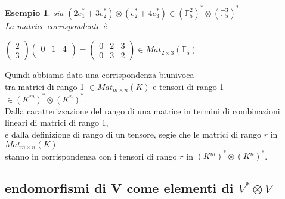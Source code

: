 \documentclass[a4paper,12pt]{article}
\theoremstyle{def}
\theoremstyle{prop}
\theoremstyle{esempio}
\newtheorem*{example}{Esempio}
\theoremstyle{dimostrazione}
\theoremstyle{teo}
\theoremstyle{osservazione}
\begin{document}
\begin{example}
	sia \((2 e_1^* + 3 e_2^*) \otimes (e_2^* + 4 e_3^*) \in (\mathbb{F}_5^2)^* \otimes (\mathbb{F}_5^3)^*\)\\
	La matrice corrispondente è
	\begin{center}
		\(\begin{pmatrix}
			2 \\
			3
		\end{pmatrix} \begin{pmatrix}
			0 & 1 & 4 \\
		\end{pmatrix} = \begin{pmatrix}
			0 & 2 & 3  \\
			0 & 3 & 2
		\end{pmatrix} \in Mat_{2 \times 3}(\mathbb{F}_5)\)
	\end{center}
\end{example}

\newpage

Quindi abbiamo dato una corrispondenza biunivoca\\
tra matrici di rango 1 \(\in Mat_{m \times n}(K)\) e tensori di rango 1 \(\in (K^m)^* \otimes (K^n)^*\).\\
Dalla caratterizzazione del rango di una matrice in termini di combinazioni lineari di matrici di rango 1,\\
e dalla definizione di rango di un tensore, segie che le matrici di rango \(r\) in \(Mat_{m \times n}(K)\)\\
stanno in corrispondenza con i tensori di rango \(r\) in \((K^m)^* \otimes (K^n)^*\).\\

\newpage

\subsection{endomorfismi di V come elementi di \(V^* \otimes V\)}
\end{document}
